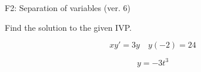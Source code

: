 \begin{exercise}
  \begin{exerciseTitle}F2: Separation of variables (ver. 6)\end{exerciseTitle}
  \begin{exerciseStatement}
    
Find the solution to the given IVP.

    
\[xy'= 3 y \hspace{1em} y( -2 ) = 24\]

  \end{exerciseStatement}
  \begin{exerciseAnswer}
    
\[y= -3 t^ 3\]

  \end{exerciseAnswer}
\end{exercise}